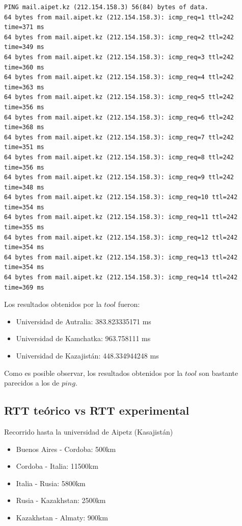 \begin{verbatim}
PING mail.aipet.kz (212.154.158.3) 56(84) bytes of data.
64 bytes from mail.aipet.kz (212.154.158.3): icmp_req=1 ttl=242 time=371 ms
64 bytes from mail.aipet.kz (212.154.158.3): icmp_req=2 ttl=242 time=349 ms
64 bytes from mail.aipet.kz (212.154.158.3): icmp_req=3 ttl=242 time=360 ms
64 bytes from mail.aipet.kz (212.154.158.3): icmp_req=4 ttl=242 time=363 ms
64 bytes from mail.aipet.kz (212.154.158.3): icmp_req=5 ttl=242 time=356 ms
64 bytes from mail.aipet.kz (212.154.158.3): icmp_req=6 ttl=242 time=368 ms
64 bytes from mail.aipet.kz (212.154.158.3): icmp_req=7 ttl=242 time=351 ms
64 bytes from mail.aipet.kz (212.154.158.3): icmp_req=8 ttl=242 time=356 ms
64 bytes from mail.aipet.kz (212.154.158.3): icmp_req=9 ttl=242 time=348 ms
64 bytes from mail.aipet.kz (212.154.158.3): icmp_req=10 ttl=242 time=354 ms
64 bytes from mail.aipet.kz (212.154.158.3): icmp_req=11 ttl=242 time=355 ms
64 bytes from mail.aipet.kz (212.154.158.3): icmp_req=12 ttl=242 time=354 ms
64 bytes from mail.aipet.kz (212.154.158.3): icmp_req=13 ttl=242 time=354 ms
64 bytes from mail.aipet.kz (212.154.158.3): icmp_req=14 ttl=242 time=369 ms
\end{verbatim}

Los resultados obtenidos por la $tool$ fueron:

\begin{itemize}
	\item Universidad de Autralia: 383.823335171 ms
	\item Universidad de Kamchatka: 963.758111 ms
	\item Universidad de Kazajistán: 448.334944248 ms
\end{itemize}

Como es posible observar, los resultados obtenidos por la $tool$ son bastante parecidos a los de $ping$.

\subsection{RTT teórico vs RTT experimental}

Recorrido hasta la universidad de Aipetz (Kasajistán)

\begin{itemize}
	\item Buenos Aires - Cordoba: 500km
	\item Cordoba - Italia: 11500km
	\item Italia - Rusia: 5800km
	\item Rusia - Kazakhstan: 2500km
	\item Kazakhstan - Almaty:  900km
\end{itemize}

